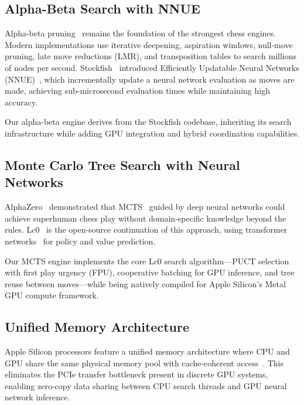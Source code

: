 \documentclass{svproc}
\begin{document}
\subsection{Alpha-Beta Search with NNUE}
\label{sec:bg-ab}

Alpha-beta pruning~\cite{knuth1975analysis} remains the foundation of the strongest chess engines. Modern implementations use iterative deepening, aspiration windows, null-move pruning, late move reductions (LMR), and transposition tables to search millions of nodes per second. Stockfish~\cite{stockfish} introduced Efficiently Updatable Neural Networks (NNUE)~\cite{nasu2018efficiently}, which incrementally update a neural network evaluation as moves are made, achieving sub-microsecond evaluation times while maintaining high accuracy.

Our alpha-beta engine derives from the Stockfish codebase, inheriting its search infrastructure while adding GPU integration and hybrid coordination capabilities.

\subsection{Monte Carlo Tree Search with Neural Networks}
\label{sec:bg-mcts}

AlphaZero~\cite{silver2018general} demonstrated that MCTS~\cite{browne2012survey} guided by deep neural networks could achieve superhuman chess play without domain-specific knowledge beyond the rules. Lc0~\cite{lc0} is the open-source continuation of this approach, using transformer networks~\cite{vaswani2017attention} for policy and value prediction.

Our MCTS engine implements the core Lc0 search algorithm---PUCT selection~\cite{rosin2011multi} with first play urgency (FPU), cooperative batching for GPU inference, and tree reuse between moves---while being natively compiled for Apple Silicon's Metal GPU compute framework.

\subsection{Unified Memory Architecture}
\label{sec:bg-unified}

Apple Silicon processors feature a unified memory architecture where CPU and GPU share the same physical memory pool with cache-coherent access~\cite{apple2020m1}. This eliminates the PCIe transfer bottleneck present in discrete GPU systems, enabling zero-copy data sharing between CPU search threads and GPU neural network inference.
\end{document}
